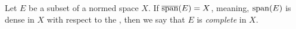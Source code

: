 \documentclass[../thesis.tex]{subfiles}
\begin{document}
\begin{definition}[Complete]\label{def:complete}  %
    Let $E$ be a subset of a normed space $X$. If $\overline{\operatorname{span}}(E) = X$, meaning, $\operatorname{span}(E)$ is dense in $X$ with respect to the \GenNormX, then we say that $E$ is \emph{complete} in $X$.  %
\end{definition}

\end{document}
